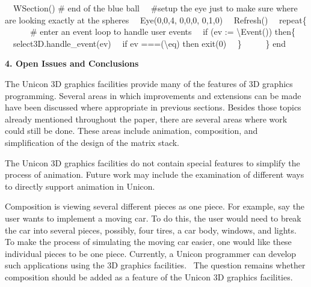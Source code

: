 \documentclass[letterpaper]{article}
\begin{document}
{ \ \ WSection() \# end of the blue ball \newline
\newline
 \ \ \#setup the eye just to make sure where are looking exactly at the spheres\newline
 \ \ Eye(0,0,4, 0,0,0, 0,1,0)\newline
 \ \ Refresh() \newline
 \ \ repeat\{ \ \ \ \ \ \ \# enter an event loop to handle user events \newline
 \ \ if (ev := {\textbackslash}Event()) then\{\newline
\ \  select3D.handle\_event(ev)\newline
\ \  if ev ===({\textquotedbl}{\textbackslash}e{\textquotedbl}{\textbar}{\textquotedbl}q{\textquotedbl}) then
exit(0)\newline
\ \  \} \newline
 \ \ \ \ \ \}\newline
end}


\bigskip

{\bfseries
4. Open Issues and Conclusions}


\bigskip

{
The Unicon 3D graphics facilities provide many of the features of 3D graphics programming. Several areas in which
improvements and extensions can be made have been discussed where appropriate in previous sections. Besides those
topics already mentioned throughout the paper, there are several areas where work could still be done. These areas
include animation, composition, and simplification of the design of the matrix stack. }

{
The Unicon 3D graphics facilities do not contain special features to simplify the process of animation. Future work may
include the examination of different ways to directly support animation in Unicon.}

{
Composition is viewing several different pieces as one piece. For example, say the user wants to implement a moving car.
To do this, the user would need to break the car into several pieces, possibly, four tires, a car body, windows, and
lights. To make the process of simulating the moving car easier, one would like these individual pieces to be one
piece. Currently, a Unicon programmer can develop such applications using the 3D graphics facilities. \ The question
remains whether composition should be added as a feature of the Unicon 3D graphics facilities.}
\end{document}
